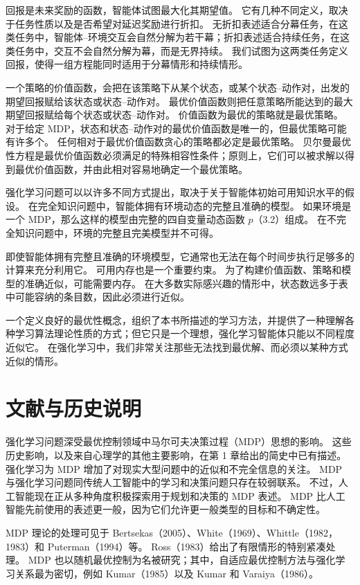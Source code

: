 \documentclass[UTF8, 12pt, fontset=fandol, oneside]{ctexart}
\begin{document}
回报是未来奖励的函数，智能体试图最大化其期望值。
它有几种不同定义，取决于任务性质以及是否希望对延迟奖励进行折扣。
无折扣表述适合分幕任务，在这类任务中，智能体--环境交互会自然分解为若干幕；折扣表述适合持续任务，在这类任务中，交互不会自然分解为幕，而是无界持续。
我们试图为这两类任务定义回报，使得一组方程能同时适用于分幕情形和持续情形。

一个策略的价值函数，会把在该策略下从某个状态，或某个状态--动作对，出发的期望回报赋给该状态或状态--动作对。
最优价值函数则把任意策略所能达到的最大期望回报赋给每个状态或状态--动作对。
价值函数为最优的策略就是最优策略。
对于给定 MDP，状态和状态--动作对的最优价值函数是唯一的，但最优策略可能有许多个。
任何相对于最优价值函数贪心的策略都必定是最优策略。
贝尔曼最优性方程是最优价值函数必须满足的特殊相容性条件；原则上，它们可以被求解以得到最优价值函数，并由此相对容易地确定一个最优策略。

强化学习问题可以以许多不同方式提出，取决于关于智能体初始可用知识水平的假设。
在完全知识问题中，智能体拥有环境动态的完整且准确的模型。
如果环境是一个 MDP，那么这样的模型由完整的四自变量动态函数 $p$（3.2）组成。
在不完全知识问题中，环境的完整且完美模型并不可得。

即使智能体拥有完整且准确的环境模型，它通常也无法在每个时间步执行足够多的计算来充分利用它。
可用内存也是一个重要约束。
为了构建价值函数、策略和模型的准确近似，可能需要内存。
在大多数实际感兴趣的情形中，状态数远多于表中可能容纳的条目数，因此必须进行近似。

一个定义良好的最优性概念，组织了本书所描述的学习方法，并提供了一种理解各种学习算法理论性质的方式；但它只是一个理想，强化学习智能体只能以不同程度近似它。
在强化学习中，我们非常关注那些无法找到最优解、而必须以某种方式近似的情形。

\section*{文献与历史说明}

强化学习问题深受最优控制领域中马尔可夫决策过程（MDP）思想的影响。
这些历史影响，以及来自心理学的其他主要影响，在第 1 章给出的简史中已有描述。
强化学习为 MDP 增加了对现实大型问题中的近似和不完全信息的关注。
MDP 与强化学习问题同传统人工智能中的学习和决策问题只存在较弱联系。
不过，人工智能现在正从多种角度积极探索用于规划和决策的 MDP 表述。
MDP 比人工智能先前使用的表述更一般，因为它们允许更一般类型的目标和不确定性。

MDP 理论的处理可见于 Bertsekas（2005）、White（1969）、Whittle（1982，1983）和 Puterman（1994）等。
Ross（1983）给出了有限情形的特别紧凑处理。
MDP 也以随机最优控制为名被研究；其中，自适应最优控制方法与强化学习关系最为密切，例如 Kumar（1985）以及 Kumar 和 Varaiya（1986）。
\end{document}
